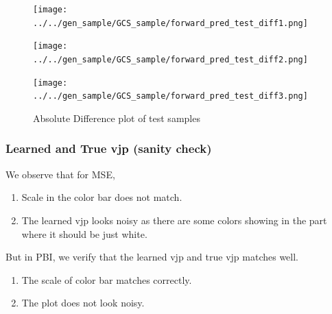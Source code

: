 \documentclass[
]{article}
\providecommand{\tightlist}{%
  \setlength{\itemsep}{0pt}\setlength{\parskip}{0pt}}\usepackage{longtable,booktabs,array}
\begin{document}
\begin{figure}

\begin{minipage}{\linewidth}

\texttt{[image: ../../gen\_sample/GCS\_sample/forward\_pred\_test\_diff1.png]}

\end{minipage}%
\newline
\begin{minipage}{\linewidth}

\texttt{[image: ../../gen\_sample/GCS\_sample/forward\_pred\_test\_diff2.png]}

\end{minipage}%
\newline
\begin{minipage}{\linewidth}

\texttt{[image: ../../gen\_sample/GCS\_sample/forward\_pred\_test\_diff3.png]}

\end{minipage}%

\caption{\label{fig-eig1000}Absolute Difference plot of test samples}

\end{figure}%

\subsubsection{Learned and True vjp (sanity
check)}\label{learned-and-true-vjp-sanity-check}

We observe that for MSE,

\begin{enumerate}
\def\labelenumi{\arabic{enumi}.}
\tightlist
\item
  Scale in the color bar does not match.
\item
  The learned vjp looks noisy as there are some colors showing in the
  part where it should be just white.
\end{enumerate}

But in PBI, we verify that the learned vjp and true vjp matches well.

\begin{enumerate}
\def\labelenumi{\arabic{enumi}.}
\tightlist
\item
  The scale of color bar matches correctly.
\item
  The plot does not look noisy.
\end{enumerate}
\end{document}
